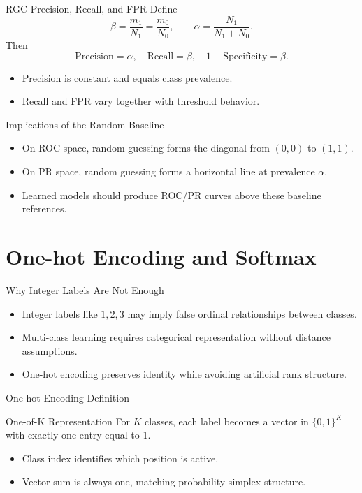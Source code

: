 \documentclass[10pt]{beamer}
\begin{document}
\begin{frame}{RGC Precision, Recall, and FPR}
  \justifying
  Define
  \[
    \beta = \frac{m_1}{N_1}=\frac{m_0}{N_0},
    \qquad
    \alpha = \frac{N_1}{N_1+N_0}.
  \]
  Then
  \[
    \mathrm{Precision}=\alpha,
    \quad
    \mathrm{Recall}=\beta,
    \quad
    1-\mathrm{Specificity}=\beta.
  \]
  \begin{itemize}
    \item Precision is constant and equals class prevalence.
    \item Recall and FPR vary together with threshold behavior.
  \end{itemize}
\end{frame}

\begin{frame}{Implications of the Random Baseline}
  \justifying
  \begin{itemize}
    \item On ROC space, random guessing forms the diagonal from $(0,0)$ to $(1,1)$.
    \item On PR space, random guessing forms a horizontal line at prevalence $\alpha$.
    \item Learned models should produce ROC/PR curves above these baseline references.
  \end{itemize}
\end{frame}

\section{One-hot Encoding and Softmax}

\begin{frame}{Why Integer Labels Are Not Enough}
  \justifying
  \begin{itemize}
    \item Integer labels like $1,2,3$ may imply false ordinal relationships between classes.
    \item Multi-class learning requires categorical representation without distance assumptions.
    \item One-hot encoding preserves identity while avoiding artificial rank structure.
  \end{itemize}
\end{frame}

\begin{frame}{One-hot Encoding Definition}
  \justifying
  \begin{conceptbox}{One-of-K Representation}
    For $K$ classes, each label becomes a vector in $\{0,1\}^K$ with exactly one entry equal to 1.
  \end{conceptbox}
  \begin{itemize}
    \item Class index identifies which position is active.
    \item Vector sum is always one, matching probability simplex structure.
  \end{itemize}
\end{frame}
\end{document}
